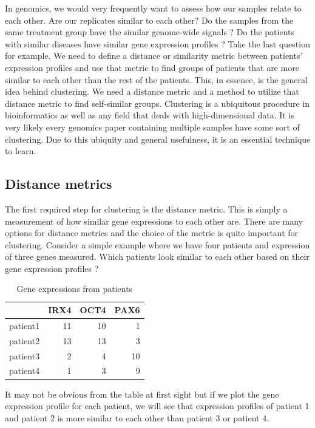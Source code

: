 \documentclass[12pt,]{krantz}
\begin{document}
In genomics, we would very frequently want to assess how our samples relate to each other. Are our replicates similar to each other? Do the samples from the same treatment group have the similar genome-wide signals ? Do the patients with similar diseases have similar gene expression profiles ?
Take the last question for example. We need to define a distance or similarity metric between patients' expression profiles and use that metric to find groups of patients that are more similar to each other than the rest of the patients. This, in essence, is the general idea behind clustering. We need a distance metric and a method to utilize that distance metric to find self-similar groups. Clustering is a ubiquitous procedure in bioinformatics as well as any field that deals with high-dimensional data. It is very likely every genomics paper containing multiple samples have some sort of clustering. Due to this ubiquity and general usefulness, it is an essential technique to learn.

\hypertarget{distance-metrics}{%
\subsection{Distance metrics}\label{distance-metrics}}

The first required step for clustering is the distance metric. This is simply a measurement of how similar gene expressions to each other are. There are many options for distance metrics and the choice of the metric is quite important for clustering. Consider a simple example where we have four patients and expression of three genes measured. Which patients look similar to each other based on their gene expression profiles ?

\begin{table}

\caption{\label{tab:expTable}Gene expressions from patients}
\centering
\begin{tabular}[t]{l|r|r|r}
\hline
  & IRX4 & OCT4 & PAX6\\
\hline
patient1 & 11 & 10 & 1\\
\hline
patient2 & 13 & 13 & 3\\
\hline
patient3 & 2 & 4 & 10\\
\hline
patient4 & 1 & 3 & 9\\
\hline
\end{tabular}
\end{table}

It may not be obvious from the table at first sight but if we plot the gene expression profile for each patient, we will see that expression profiles of patient 1 and patient 2 is more similar to each other than patient 3 or patient 4.
\end{document}

